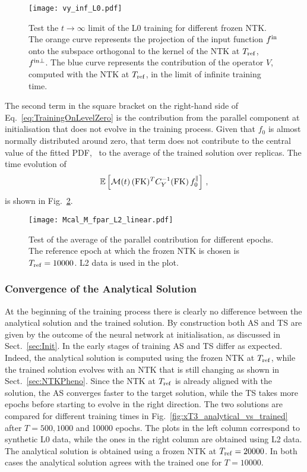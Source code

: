 \begin{figure}[t]
  \centering
  \texttt{[image: vy\_inf\_L0.pdf]}  
  \caption{Test the $t\to\infty$ limit of the L0 training for different frozen
  NTK. The orange curve represents the projection of the input function $f^{\rm in}$
  onto the subspace orthogonal to the kernel of the NTK at $T_{\rm ref}$, \ie\
  $f^{\rm in \perp}$. The blue curve represents the contribution of the operator $V$,
  computed with the NTK at $T_{\rm ref}$, in the limit of infinite training
  time.}
  \label{fig:InfiniteTimeVterm}
\end{figure}

The second term in the square bracket on the right-hand side of
Eq.~\eqref{eq:TrainingOnLevelZero} is the contribution from the parallel
component at initialisation that does not evolve in the training process. Given
that $f_0$ is almost normally distributed around zero, that term does not
contribute to the central value of the fitted PDF, \ie\ to the average of the
trained solution over replicas. The time evolution of 
\begin{align}
  \label{eq:AverageLevelZeroUcheck}
  \mathbb{E}\left[\mathcal{M}(t)\, (\mathrm{FK})^T C_{Y}^{-1} (\mathrm{FK})\, 
    f_{0}^\parallel\right]\, ,
\end{align}
is shown in Fig.~\ref{fig:AverageLevelZeroUcheck}.
\begin{figure}[h!]
  \centering
  \texttt{[image: Mcal\_M\_fpar\_L2\_linear.pdf]} 
  \caption{Test of the average of the parallel contribution for different
  epochs. The reference epoch at which the frozen NTK is chosen is $T_{\rm ref}
  = 10000$. L2 data is used in the plot.}
  \label{fig:AverageLevelZeroUcheck}
\end{figure}

\FloatBarrier

\subsubsection{Convergence of the Analytical Solution}
\label{sec:CheckAnalyticalConvergence}

At the beginning of the training process there is clearly no difference between
the analytical solution and the trained solution. By construction both AS and TS
are given by the outcome of the neural network at initialisation, as discussed
in Sect.~\ref{sec:Init}. In the early stages of training AS and TS differ as
expected. Indeed, the analytical solution is computed using the frozen NTK at
$T_{\rm ref}$, while the trained solution evolves with an NTK that is still
changing as shown in Sect.~\ref{sec:NTKPheno}. Since the NTK at $T_{\rm ref}$ is
already aligned with the solution, the AS converges faster to the target
solution, while the TS takes more epochs before starting to evolve in the right
direction. The two solutions are compared for different training times in
Fig.~\ref{fig:xT3_analytical_vs_trained} after $T=500, 1000$ and 10000 epochs.
The plots in the left column correspond to synthetic L0 data, while the ones in
the right column are obtained using L2 data. The analytical solution is obtained
using a frozen NTK at $T_{\rm ref}=20000$. In both cases the analytical solution
agrees with the trained one for $T=10000$.

